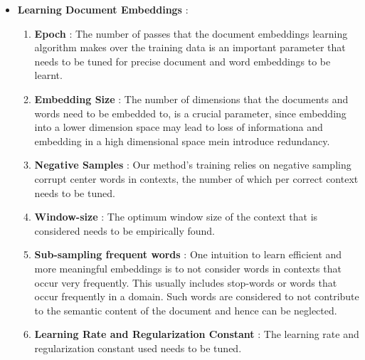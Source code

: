 \documentclass{article}
\begin{document}
\begin{itemize}
\item \textbf{Learning Document Embeddings} : 

\begin{enumerate}
\item \textbf{Epoch} : The number of passes that the document embeddings learning algorithm makes over the training data is an important parameter that needs to be tuned for precise document and word embeddings to be learnt.

\item \textbf{Embedding Size} : The number of dimensions that the documents and words need to be embedded to, is a crucial parameter, since embedding into a lower dimension space may lead to loss of informationa and embedding in a high dimensional space mein introduce redundancy.

\item \textbf{Negative Samples} : Our method's training relies on negative sampling corrupt center words in contexts, the number of which per correct context needs to be tuned.

\item \textbf{Window-size} : The optimum window size of the context that is considered needs to be empirically found.

\item \textbf{Sub-sampling frequent words} : One intuition to learn efficient and more meaningful embeddings is to not consider words in contexts that occur very frequently. This usually includes stop-words or words that occur frequently in a domain. Such words are considered to not contribute to the semantic content of the document and hence can be neglected. 

\item \textbf{Learning Rate and Regularization Constant} : The learning rate and regularization constant used needs to be tuned.
\end{enumerate}

\end{itemize}
\end{document}
